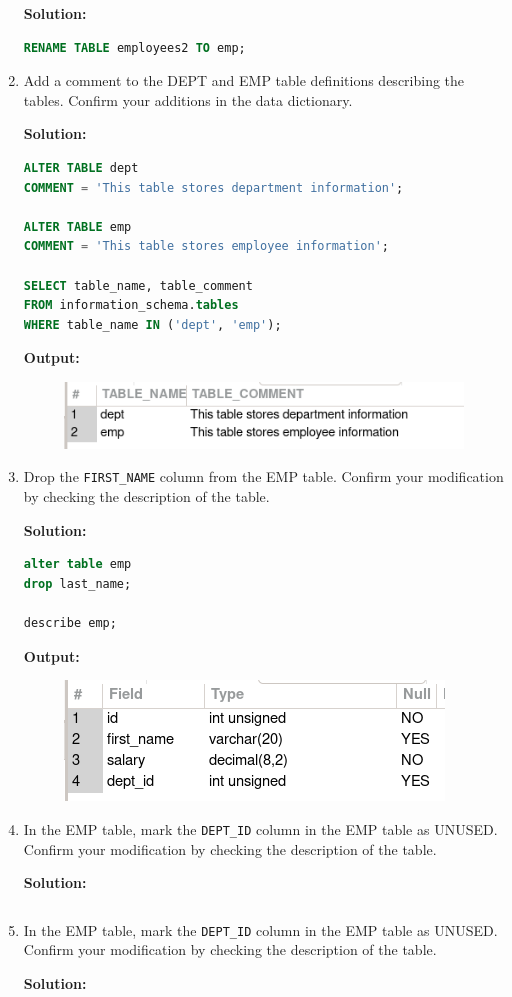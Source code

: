 \begin{enumerate}
    \textbf{Solution: }
    \begin{lstlisting}[language=SQL]
RENAME TABLE employees2 TO emp;
    \end{lstlisting}
\newpage
    \item Add a comment to the DEPT and EMP table definitions describing the tables. Confirm your
additions in the data dictionary.

\textbf{Solution: }
    \begin{lstlisting}[language=SQL]
ALTER TABLE dept
COMMENT = 'This table stores department information';

ALTER TABLE emp
COMMENT = 'This table stores employee information';

SELECT table_name, table_comment
FROM information_schema.tables
WHERE table_name IN ('dept', 'emp');
    \end{lstlisting}
\textbf{Output: }
    \begin{figure}[h]
        \centering
        \includegraphics[width=0.8\linewidth]{graphics/p99.png}
    \end{figure}
    \newpage
    \item Drop the \texttt{FIRST\_NAME} column from the EMP table. Confirm your modification by checking the
description of the table.

    \textbf{Solution: }
    \begin{lstlisting}[language=SQL]
alter table emp
drop last_name;

describe emp;
    \end{lstlisting}
    \textbf{Output: }
    \begin{figure}[h]
        \centering
        \includegraphics[width=0.5\linewidth]{graphics/p910.png}
    \end{figure}
    \item In the EMP table, mark the \texttt{DEPT\_ID} column in the EMP table as UNUSED. Confirm your
modification by checking the description of the table.

    \textbf{Solution: }
    \begin{lstlisting}[language=SQL]
    \end{lstlisting}

    \item In the EMP table, mark the \texttt{DEPT\_ID} column in the EMP table as UNUSED. Confirm your
modification by checking the description of the table.

    \textbf{Solution: }
    \begin{lstlisting}[language=SQL]
    \end{lstlisting}
\end{enumerate}